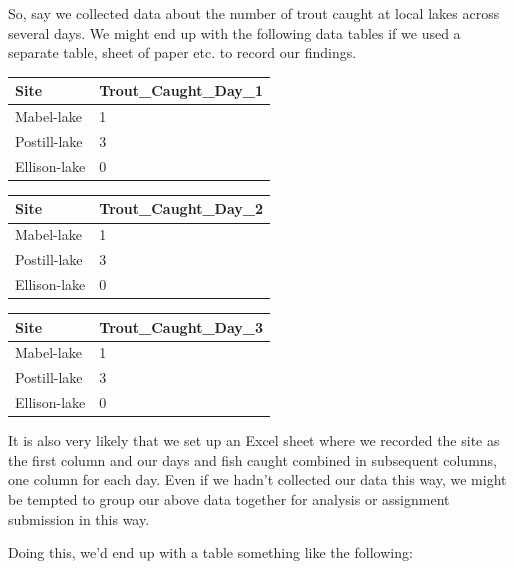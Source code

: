 \documentclass[
]{book}
\begin{document}
So, say we collected data about the number of trout caught at local lakes across several days. We might end up with the following data tables if we used a separate table, sheet of paper etc. to record our findings.

\begin{longtable}[]{@{}ll@{}}
\toprule
Site & Trout\_Caught\_Day\_1 \\
\midrule
\endhead
Mabel-lake & 1 \\
Postill-lake & 3 \\
Ellison-lake & 0 \\
\bottomrule
\end{longtable}

\begin{longtable}[]{@{}ll@{}}
\toprule
Site & Trout\_Caught\_Day\_2 \\
\midrule
\endhead
Mabel-lake & 1 \\
Postill-lake & 3 \\
Ellison-lake & 0 \\
\bottomrule
\end{longtable}

\begin{longtable}[]{@{}ll@{}}
\toprule
Site & Trout\_Caught\_Day\_3 \\
\midrule
\endhead
Mabel-lake & 1 \\
Postill-lake & 3 \\
Ellison-lake & 0 \\
\bottomrule
\end{longtable}

It is also very likely that we set up an Excel sheet where we recorded the site as the first column and our days and fish caught combined in subsequent columns, one column for each day. Even if we hadn't collected our data this way, we might be tempted to group our above data together for analysis or assignment submission in this way.

Doing this, we'd end up with a table something like the following:
\end{document}
